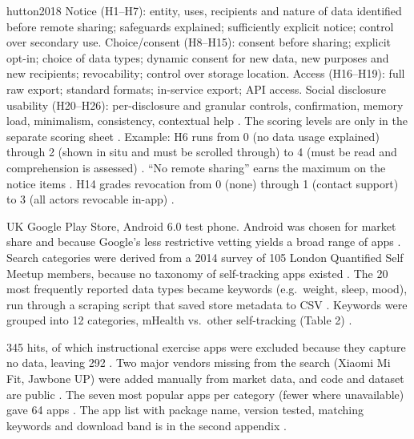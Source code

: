 \begin{papercard}{hutton2018}
 Notice (H1--H7): entity, uses, recipients and nature of data identified before remote sharing; safeguards explained; sufficiently explicit notice; control over secondary use. Choice/consent (H8--H15): consent before sharing; explicit opt-in; choice of data types; dynamic consent for new data, new purposes and new recipients; revocability; control over storage location. Access (H16--H19): full raw export; standard formats; in-service export; API access. Social disclosure usability (H20--H26): per-disclosure and granular controls, confirmation, memory load, minimalism, consistency, contextual help . The scoring levels are only in the separate scoring sheet . Example: H6 runs from 0 (no data usage explained) through 2 (shown in situ and must be scrolled through) to 4 (must be read and comprehension is assessed) . ``No remote sharing'' earns the maximum on the notice items . H14 grades revocation from 0 (none) through 1 (contact support) to 3 (all actors revocable in-app) .

 UK Google Play Store, Android 6.0 test phone. Android was chosen for market share and because Google's less restrictive vetting yields a broad range of apps . Search categories were derived from a 2014 survey of 105 London Quantified Self Meetup members, because no taxonomy of self-tracking apps existed . The 20 most frequently reported data types became keywords (e.g.\ weight, sleep, mood), run through a scraping script that saved store metadata to CSV . Keywords were grouped into 12 categories, mHealth vs.\ other self-tracking (Table 2) .

 345 hits, of which instructional exercise apps were excluded because they capture no data, leaving 292 . Two major vendors missing from the search (Xiaomi Mi Fit, Jawbone UP) were added manually from market data, and code and dataset are public . The seven most popular apps per category (fewer where unavailable) gave 64 apps . The app list with package name, version tested, matching keywords and download band is in the second appendix .


\end{papercard}
